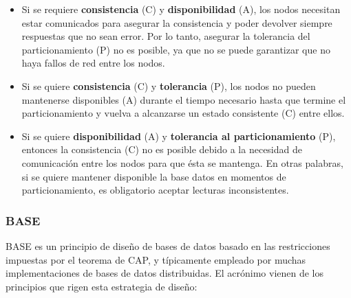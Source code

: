 \begin{itemize}
	\item Si se requiere \textbf{consistencia} (C) y \textbf{disponibilidad}  (A), los nodos necesitan estar comunicados para asegurar la consistencia y poder devolver siempre respuestas que no sean error. Por lo tanto, asegurar la tolerancia del particionamiento (P) no es posible, ya que no se puede garantizar que no haya fallos de red entre los nodos.
	
	\item Si se quiere \textbf{consistencia} (C) y \textbf{tolerancia} (P), los nodos no pueden mantenerse disponibles (A) durante el tiempo necesario hasta que termine el particionamiento y vuelva a alcanzarse un estado consistente (C) entre ellos.
	
	\item Si se quiere \textbf{disponibilidad} (A) y \textbf{tolerancia al particionamiento} (P), entonces la consistencia (C) no es posible debido a la necesidad de comunicación entre los nodos para que ésta se mantenga. En otras palabras, si se quiere mantener disponible la base datos en momentos de particionamiento, es obligatorio aceptar lecturas inconsistentes.
	
\end{itemize}


\subsubsection{BASE}
BASE es un principio de diseño de bases de datos basado en las restricciones impuestas por el teorema de CAP, y típicamente empleado por muchas implementaciones de bases de datos distribuidas. El acrónimo vienen de los principios que rigen esta estrategia de diseño:

